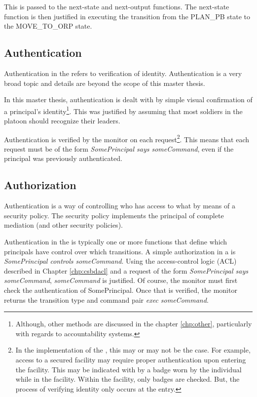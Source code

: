 \documentclass[../../main/main.tex]{subfiles}
\begin{document}
This is passed to the next-state and next-output functions.  The next-state function is then justified in executing the transition from the PLAN_PB state to the MOVE_TO_ORP state.  

\subsection{Authentication}
Authentication in the  refers to verification of identity.  Authentication is a very broad topic and details are beyond the scope of this master thesis.  

In this master thesis, authentication is dealt with by simple visual confirmation of a principal's identity\footnote{Although, other methods are discussed in the chapter \ref{chp:other}, particularly with regards to accountability systems.}.  This was justified by assuming that most soldiers in the platoon should recognize their leaders.

Authentication is verified by the monitor on each request\footnote{In the implementation of the , this may or may not be the case.  For example, access to a secured facility may require proper authentication upon entering the facility.  This may be indicated with by a badge worn by the individual while in the facility.  Within the facility, only badges are checked.  But, the process of verifying identity only occurs at the entry.}.  This means that each request must be of the form \textit{SomePrincipal says someCommand}, even if the principal was previously authenticated.  

\subsection{Authorization}
Authentication is a way of controlling who has access to what by means of a security policy.  The security policy implements the principal of complete mediation (and other security policies).  

Authentication in the  is typically one or more functions that define which principals have control over which transitions.  A simple authorization in a  is \textit{SomePrincipal controls someCommand}.    Using the access-control logic (ACL) described in Chapter \ref{chp:csbdacl} and a request of the form \textit{SomePrincipal says someCommand}, \textit{someCommand} is justified.  Of course, the monitor must first check the authentication of SomePrincipal.  Once that is verified, the monitor returns the transition type and command pair \textit{exec someCommand}.
\end{document}
